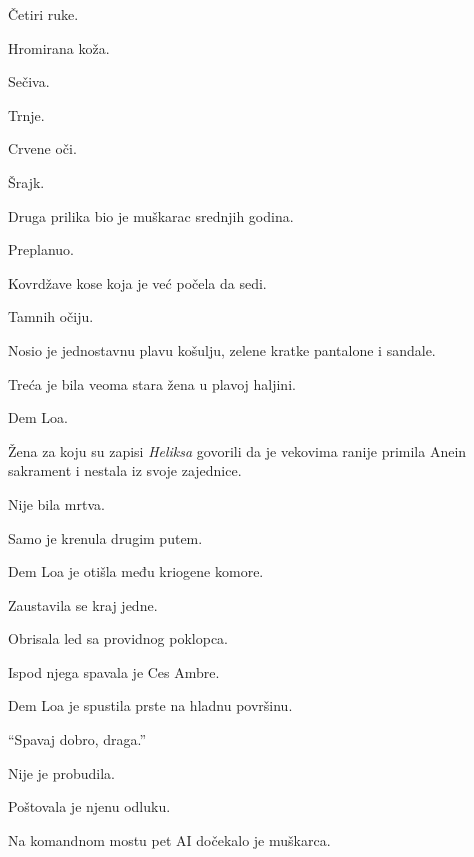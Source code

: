 Četiri ruke.

Hromirana koža.

Sečiva.

Trnje.

Crvene oči.

\bigskip

Šrajk.

\bigskip

Druga prilika bio je muškarac srednjih godina.

\bigskip

Preplanuo.

Kovrdžave kose koja je već počela da sedi.

Tamnih očiju.

\bigskip

Nosio je jednostavnu plavu košulju, zelene kratke pantalone i sandale.

\bigskip

Treća je bila veoma stara žena u plavoj haljini.

\bigskip

Dem Loa.

\bigskip

Žena za koju su zapisi \emph{Heliksa} govorili da je vekovima ranije primila Anein sakrament i nestala iz svoje zajednice.

\bigskip

Nije bila mrtva.

\bigskip

Samo je krenula drugim putem.

\bigskip

Dem Loa je otišla među kriogene komore.

\bigskip

Zaustavila se kraj jedne.

\bigskip

Obrisala led sa providnog poklopca.

\bigskip

Ispod njega spavala je Ces Ambre.

\bigskip

Dem Loa je spustila prste na hladnu površinu.

``Spavaj dobro, draga.''

\bigskip

Nije je probudila.

\bigskip

Poštovala je njenu odluku.

\bigskip

Na komandnom mostu pet AI dočekalo je muškarca.

